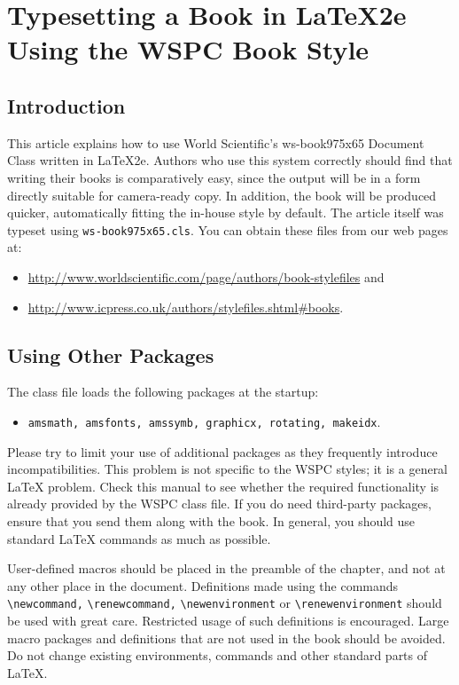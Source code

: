\chapter[Typesetting a Book in \LaTeX2e Using the WSPC Book Style]{Typesetting a Book in \LaTeX2e\\ Using the WSPC Book Style\label{ch1}}

\section{Introduction}\label{sec1.1}
This article explains how to use World Scientific's ws-book975x65
Document Class written in \LaTeX2e. Authors who use this system
correctly should find that writing their books is comparatively
easy, since the output will be in a form directly suitable for
camera-ready copy. In addition, the book will be produced quicker,
automatically fitting the in-house style by default. The article
itself was typeset using \verb|ws-book975x65.cls|.
You can obtain these files from our web pages at:
\begin{itemize}
\item \url{http://www.worldscientific.com/page/authors/book-stylefiles} and
\item \url{http://www.icpress.co.uk/authors/stylefiles.shtml#books}.
\end{itemize}

\section{Using Other Packages}\label{sec1.2}
The class file loads the following packages at the startup:

\begin{itemize}
\item \verb|amsmath, amsfonts, amssymb, graphicx, rotating, makeidx|.
\end{itemize}

Please try to limit your use of additional packages
as they frequently introduce incompatibilities. This problem is not
specific to the WSPC styles; it is a general \LaTeX{} problem. Check
this manual to see whether the required functionality is already
provided by the WSPC class file. If you do need third-party
packages, ensure that you send them along with the book. In general,
you should use standard \LaTeX{} commands as much as possible.

User-defined macros should be placed in the preamble of the chapter,
and not at any other place in the document. Definitions made using
the commands \verb|\newcommand,| \verb|\renewcommand,|
\verb|\newenvironment| or \verb|\renewenvironment| should be used
with great care. Restricted usage of such definitions is encouraged.
Large macro packages and definitions that are not used in the book
should be avoided. Do not change existing environments, commands and
other standard parts of \LaTeX.

